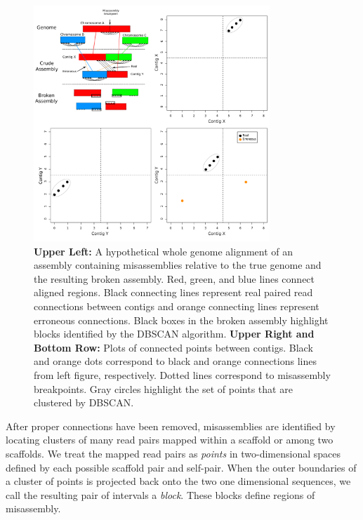 \documentclass{bioinfo}
\begin{document}
\begin{figure}[t]
\includegraphics[width=3.5in]{fish-qc.pdf}
\vspace{-1cm}
\caption{\textbf{Upper Left:}  A hypothetical whole genome alignment of an assembly containing misassemblies relative to the true genome and the 
resulting broken assembly. Red, green, and blue lines connect aligned regions. Black connecting lines represent real paired read 
connections between contigs and orange connecting lines represent erroneous connections. Black boxes in the broken assembly highlight
blocks identified by the DBSCAN algorithm. \textbf{Upper Right and Bottom Row:} Plots of connected points between contigs. Black and orange dots 
correspond to black and orange connections lines from left figure, respectively. Dotted lines correspond
to misassembly breakpoints. Gray circles highlight the set of points that are clustered by DBSCAN. }\label{fig:02}
\end{figure}

After proper connections have been removed, misassemblies are identified by locating clusters of many read pairs mapped within
a scaffold or among two scaffolds. We treat the mapped read pairs as \emph{points} in
two-dimensional spaces defined by each possible scaffold pair and self-pair. When the outer boundaries of a cluster of points
is projected back onto the two one dimensional sequences, we call the resulting pair of intervals a \emph{block}.
These blocks define regions of misassembly.
\end{document}
